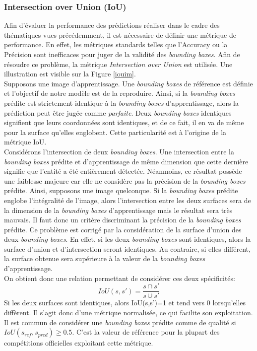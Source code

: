 \subsubsection{Intersection over Union (IoU)}
Afin d'évaluer la performance des prédictions réaliser dans le cadre des thématiques vues précédemment, il est nécessaire de définir une métrique de performance. En effet, les métriques standards telles que l'Accuracy ou la Précision sont inefficaces pour juger de la validité des \textit{bounding boxes}. Afin de résoudre ce problème, la métrique \textit{Intersection over Union} est utilisée. Une illustration est visible sur la Figure \ref{iouim}.\\

\noindent Supposons une image d'apprentissage. Une \textit{bounding boxes} de référence est définie et l'objectif de notre modèle est de la reproduire. Ainsi, si la \textit{bounding boxes} prédite est strictement identique à la \textit{bounding boxes} d'apprentissage, alors la prédiction peut être jugée comme \textit{parfaite}. Deux \textit{bounding boxes} identiques signifient que leurs coordonnées sont identiques, et de ce fait, il en va de même pour la surface qu'elles englobent. Cette particularité est à l'origine de la métrique IoU.\\

\noindent Considérons l'intersection de deux \textit{bounding boxes}. Une intersection entre la \textit{bounding boxes} prédite et d'apprentissage de même dimension que cette dernière signifie que l'entité a été entièrement détectée. Néanmoins, ce résultat possède une faiblesse majeure car elle ne considère pas la précision de la \textit{bounding boxes} prédite. Ainsi, supposons une image quelconque. Si la \textit{bounding boxes} prédite englobe l'intégralité de l'image, alors l'intersection entre les deux surfaces sera de la dimension de la \textit{bounding boxes} d'apprentissage mais le résultat sera très mauvais. Il faut donc un critère discriminant la précision de la \textit{bounding boxes} prédite. Ce problème est corrigé par la considération de la surface d'union des deux \textit{bounding boxes}. En effet, si les deux \textit{bounding boxes} sont identiques, alors la surface d'union et d'intersection seront identiques. Au contraire, si elles différent, la surface obtenue sera supérieure à la valeur de la \textit{bounding boxes} d'apprentissage. \\

\noindent On obtient donc une relation permettant de considérer ces deux spécificités: $$IoU(s,s')=\frac{s \cap s'}{s \cup s'}$$
Si les deux surfaces sont identiques, alors IoU(s,s')=1 et tend vers 0 lorsqu'elles diffèrent. Il s'agit donc d'une métrique normalisée, ce qui facilite son exploitation. Il est commun de considérer une \textit{bounding boxes} prédite comme de qualité si $IoU(s_{ref},s_{pred}) \geq 0.5$. C'est la valeur de référence pour la plupart des compétitions officielles exploitant cette métrique.

